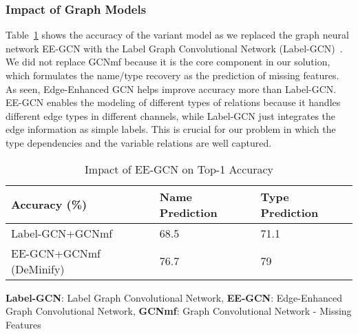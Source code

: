 \subsubsection{Impact of Graph Models}
\label{sec:models}





Table~\ref{tab:sensi-graph} shows the accuracy of the variant model
as we replaced the graph neural network EE-GCN with the Label Graph
Convolutional Network (Label-GCN)~\cite{label-gcn}. We did not replace
GCNmf because it is the core component in our solution, which
formulates the name/type recovery as the prediction of missing
features. As seen, Edge-Enhanced GCN helps improve accuracy more than
Label-GCN. EE-GCN enables the modeling of different types of relations
because it handles different edge types in different channels, while
Label-GCN just integrates the edge information as simple labels.
This is crucial for our problem in which the type dependencies
and the variable relations are well captured.


\begin{table}[t]%
  \centering
  \tabcolsep 2.5pt
    \begin{tabular}{|l|l|l|}
    \hline
        Accuracy (\%) & Name Prediction & Type Prediction\\ \hline
        Label-GCN+GCNmf & 68.5 & 71.1 \\ \hline
        EE-GCN+GCNmf (DeMinify) & 76.7 & 79 \\ \hline
    \end{tabular}
    {\bf Label-GCN}: Label Graph Convolutional Network, {\bf EE-GCN}: Edge-Enhanced Graph Convolutional Network, {\bf GCNmf}: Graph Convolutional Network - Missing Features
    \caption{Impact of EE-GCN on Top-1 Accuracy}
    \vspace{-10pt}
    \label{tab:sensi-graph}
\end{table}

